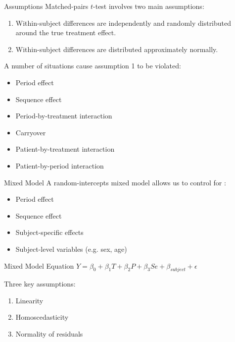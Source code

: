 \documentclass{beamer}
\begin{document}
\begin{frame}{Assumptions}
    Matched-pairs $t$-test involves two main assumptions:
    \begin{enumerate}
        \item Within-subject differences are independently and randomly distributed around the true treatment effect.
        \item Within-subject differences are distributed approximately normally.
    \end{enumerate}
    A number of situations cause assumption 1 to be violated:
    \begin{itemize}
        \item Period effect
        \item Sequence effect
        \item Period-by-treatment interaction
        \item Carryover
        \item Patient-by-treatment interaction
        \item Patient-by-period interaction
    \end{itemize}
\end{frame}
\begin{frame}{Mixed Model}
    A random-intercepts mixed model allows us to control for \cite{jones2003design} \cite{mixedmodelsR}:
    \begin{itemize}
        \item Period effect
        \item Sequence effect
        \item Subject-specific effects
        \item Subject-level variables (e.g. sex, age)
    \end{itemize}
    \begin{block}{Mixed Model Equation}
        $Y = \beta_0 + \beta_1 T + \beta_2 P + \beta_3 Se + \beta_{subject} + \epsilon$
    \end{block}
    Three key assumptions:
    \begin{enumerate}
        \item Linearity
        \item Homoscedasticity
        \item Normality of residuals
    \end{enumerate}
\end{frame}
\end{document}
